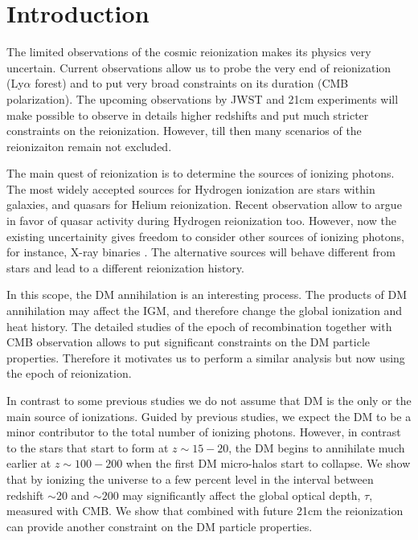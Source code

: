 \section{Introduction}

The limited observations of the cosmic reionization makes its physics very uncertain. Current observations allow us to probe the very end of reionization (Ly$\alpha$ forest) and to put very broad constraints on its duration (CMB polarization). The upcoming observations by JWST and 21cm experiments will make possible to observe in details higher redshifts and put much stricter constraints on the reionization. However, till then many scenarios of the reionizaiton remain not excluded.

The main quest of reionization is to determine the sources of ionizing photons. The most widely accepted sources for Hydrogen ionization are stars within galaxies, and quasars for Helium reionization. Recent observation allow \cite{2015arXiv150707678M} to argue in favor of quasar activity during Hydrogen reionization too. However, now the existing uncertainity gives freedom to consider other sources of ionizing photons, for instance, X-ray binaries \cite{Fialkov_2014}. The alternative sources will behave different from stars and lead to a different reionization history.

In this scope, the DM annihilation is an interesting process. The products of DM annihilation may affect the IGM, and therefore change the global ionization and heat history. The detailed studies of the epoch of recombination together with CMB observation allows \citet{2015arXiv150603811S} to put significant constraints on the DM particle properties. Therefore it motivates us to perform a similar analysis but now using the epoch of reionization. 

In contrast to some previous studies \cite{2009JCAP...10..009C, 2009PhRvD..80c5007B} we do not assume that DM is the only or the main source of ionizations. Guided by previous studies, we expect the DM to be a minor contributor to the total number of ionizing photons. However, in contrast to the stars that start to form at $z\sim 15-20$, the DM begins to annihilate much earlier at $z\sim100-200$ when the first DM micro-halos start to collapse. We show that by ionizing the universe to a few percent level in the interval between redshift $\sim20$ and $\sim200$ may significantly affect the global optical depth, $\tau$, measured with CMB. We show that combined with future 21cm the reionization can provide another constraint on the DM particle properties.

